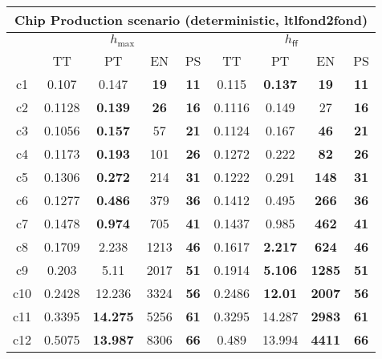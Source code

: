 \documentclass[landscape]{article}%
\begin{document}
%
\normalsize%
\begin{tabular}{||c||c|c|c|c|c|c|c|c||}%
\multicolumn{9}{c}{\textbf{Chip Production scenario (deterministic, ltlfond2fond)}}\\%
\hline%
&\multicolumn{4}{||c||}{$h_{\max}$}&\multicolumn{4}{||c||}{$h_{\mathsf{ff}}$}\\%
\hline%
&\small{TT}&\small{PT}&\small{EN}&\small{PS}&\small{TT}&\small{PT}&\small{EN}&\small{PS}\\%
\hline%
c1&\small{0.107}&\small{0.147}&\small{\textbf{19}}&\small{\textbf{11}}&\small{0.115}&\small{\textbf{0.137}}&\small{\textbf{19}}&\small{\textbf{11}}\\%
\hline%
c2&\small{0.1128}&\small{\textbf{0.139}}&\small{\textbf{26}}&\small{\textbf{16}}&\small{0.1116}&\small{0.149}&\small{27}&\small{\textbf{16}}\\%
\hline%
c3&\small{0.1056}&\small{\textbf{0.157}}&\small{57}&\small{\textbf{21}}&\small{0.1124}&\small{0.167}&\small{\textbf{46}}&\small{\textbf{21}}\\%
\hline%
c4&\small{0.1173}&\small{\textbf{0.193}}&\small{101}&\small{\textbf{26}}&\small{0.1272}&\small{0.222}&\small{\textbf{82}}&\small{\textbf{26}}\\%
\hline%
c5&\small{0.1306}&\small{\textbf{0.272}}&\small{214}&\small{\textbf{31}}&\small{0.1222}&\small{0.291}&\small{\textbf{148}}&\small{\textbf{31}}\\%
\hline%
c6&\small{0.1277}&\small{\textbf{0.486}}&\small{379}&\small{\textbf{36}}&\small{0.1412}&\small{0.495}&\small{\textbf{266}}&\small{\textbf{36}}\\%
\hline%
c7&\small{0.1478}&\small{\textbf{0.974}}&\small{705}&\small{\textbf{41}}&\small{0.1437}&\small{0.985}&\small{\textbf{462}}&\small{\textbf{41}}\\%
\hline%
c8&\small{0.1709}&\small{2.238}&\small{1213}&\small{\textbf{46}}&\small{0.1617}&\small{\textbf{2.217}}&\small{\textbf{624}}&\small{\textbf{46}}\\%
\hline%
c9&\small{0.203}&\small{5.11}&\small{2017}&\small{\textbf{51}}&\small{0.1914}&\small{\textbf{5.106}}&\small{\textbf{1285}}&\small{\textbf{51}}\\%
\hline%
c10&\small{0.2428}&\small{12.236}&\small{3324}&\small{\textbf{56}}&\small{0.2486}&\small{\textbf{12.01}}&\small{\textbf{2007}}&\small{\textbf{56}}\\%
\hline%
c11&\small{0.3395}&\small{\textbf{14.275}}&\small{5256}&\small{\textbf{61}}&\small{0.3295}&\small{14.287}&\small{\textbf{2983}}&\small{\textbf{61}}\\%
\hline%
c12&\small{0.5075}&\small{\textbf{13.987}}&\small{8306}&\small{\textbf{66}}&\small{0.489}&\small{13.994}&\small{\textbf{4411}}&\small{\textbf{66}}\\%
\hline%
\end{tabular}%
\end{document}
